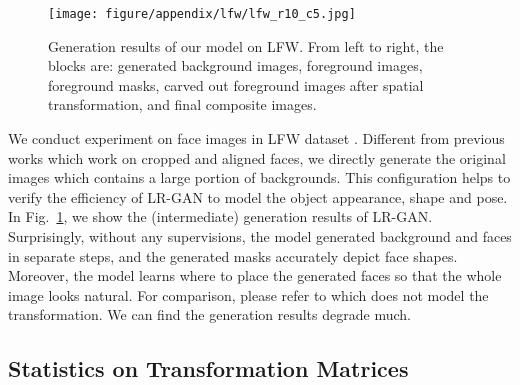 \documentclass{article} \usepackage{iclr2017_conference,times}
\begin{document}
\begin{figure}[!ht]
\begin{minipage}{1\linewidth}
\center
\texttt{[image: figure/appendix/lfw/lfw\_r10\_c5.jpg]}
\end{minipage}
\caption{Generation results of our model on LFW. From left to right, the blocks are: generated background images, foreground images, foreground masks, carved out foreground images after spatial transformation, and final composite images.}
\label{Fig_LFWOutputs}
\end{figure} 

We conduct experiment on face images in LFW dataset \citep{LFWTech}. Different from previous works which work on cropped and aligned faces, we directly generate the original images which contains a large portion of backgrounds. This configuration helps to verify the efficiency of LR-GAN to model the object appearance, shape and pose. In Fig.~\ref{Fig_LFWOutputs}, we show the (intermediate) generation results of LR-GAN. Surprisingly, without any supervisions, the model generated background and faces in separate steps, and the generated masks accurately depict face shapes. Moreover, the model learns where to place the generated faces so that the whole image looks natural. For comparison, please refer to \citep{CompositeGAN} which does not model the transformation. We can find the generation results degrade much.

\subsection{Statistics on Transformation Matrices}
\end{document}
